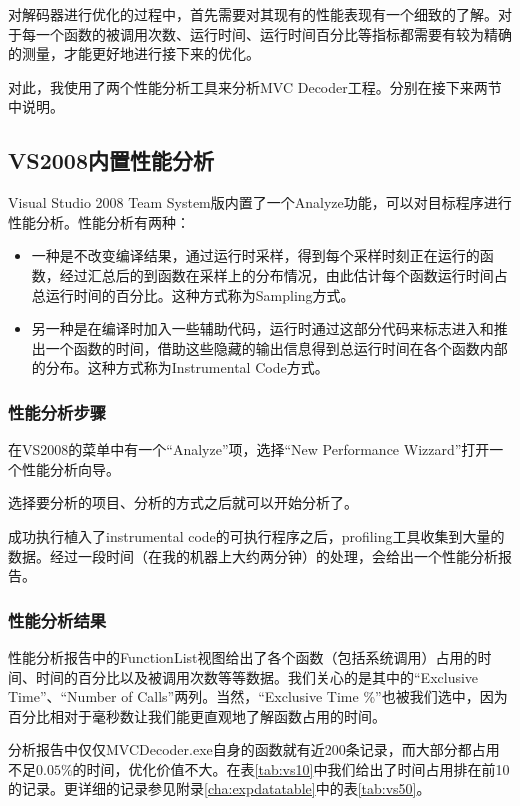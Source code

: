 对解码器进行优化的过程中，首先需要对其现有的性能表现有一个细致的了解。对于每一个函数的被调用次数、运行时间、运行时间百分比等指标都需要有较为精确的测量，才能更好地进行接下来的优化。

对此，我使用了两个性能分析工具来分析MVC Decoder工程。分别在接下来两节中说明。

\subsection{VS2008内置性能分析}
\label{subsec:vsprofiling}
Visual Studio 2008 Team System版内置了一个Analyze功能，可以对目标程序进行性能分析。性能分析有两种：
\begin{itemize}
\item 一种是不改变编译结果，通过运行时采样，得到每个采样时刻正在运行的函数，经过汇总后的到函数在采样上的分布情况，由此估计每个函数运行时间占总运行时间的百分比。这种方式称为Sampling方式。
\item 另一种是在编译时加入一些辅助代码，运行时通过这部分代码来标志进入和推出一个函数的时间，借助这些隐藏的输出信息得到总运行时间在各个函数内部的分布。这种方式称为Instrumental Code方式。
\end{itemize}

\subsubsection{性能分析步骤}
\label{subsubsec:profilingprocess}

在VS2008的菜单中有一个“Analyze”项，选择“New Performance Wizzard”打开一个性能分析向导。

选择要分析的项目、分析的方式之后就可以开始分析了。

成功执行植入了instrumental code的可执行程序之后，profiling工具收集到大量的数据。经过一段时间（在我的机器上大约两分钟）的处理，会给出一个性能分析报告。

\subsubsection{性能分析结果}
\label{subsubsec:reportexerpt}

性能分析报告中的FunctionList视图给出了各个函数（包括系统调用）占用的时间、时间的百分比以及被调用次数等等数据。我们关心的是其中的“Exclusive Time”、“Number of Calls”两列。当然，“Exclusive Time \%”也被我们选中，因为百分比相对于毫秒数让我们能更直观地了解函数占用的时间。



分析报告中仅仅MVCDecoder.exe自身的函数就有近200条记录，而大部分都占用不足$0.05\%$的时间，优化价值不大。在表\ref{tab:vs10}中我们给出了时间占用排在前10的记录。更详细的记录参见附录\ref{cha:expdatatable}中的表\ref{tab:vs50}。

